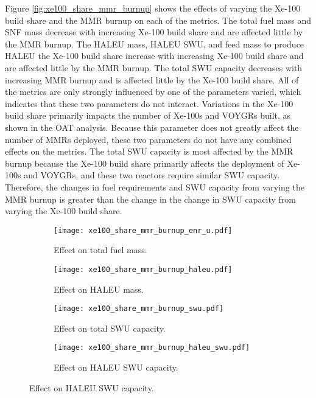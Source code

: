 Figure \ref{fig:xe100_share_mmr_burnup} shows the effects of varying the 
Xe-100 build share and the \gls{MMR} burnup on each of the metrics. 
The total fuel mass and \gls{SNF} mass decrease with increasing 
Xe-100 build share and are affected little by the \gls{MMR} burnup. The
\gls{HALEU} mass, \gls{HALEU} \gls{SWU}, and feed mass to produce 
\gls{HALEU} the Xe-100 build share  increase with increasing Xe-100 
build share and are affected little by the \gls{MMR} burnup. The total 
\gls{SWU} capacity decreases with increasing \gls{MMR} burnup and is 
affected little by the Xe-100 build share. All of the metrics are only 
strongly influenced by one of the parameters varied, which indicates that 
these two parameters do not interact. Variations in the Xe-100 build 
share primarily impacts the number of Xe-100s and VOYGRs built, as shown 
in the \gls{OAT} analysis. Because this parameter does not greatly affect 
the number of \glspl{MMR} deployed, these two parameters do not have any 
combined effects on the metrics. The total \gls{SWU} capacity is most affected 
by the \gls{MMR} burnup because the Xe-100 build share primarily 
affects the deployment of Xe-100s and VOYGRs, and these two reactors 
require similar \gls{SWU} capacity. Therefore, the changes in fuel 
requirements and \gls{SWU} capacity from varying the \gls{MMR} burnup 
is greater than the change in the change in \gls{SWU} capacity from 
varying the Xe-100 build share. 
\begin{figure}
    \begin{subfigure}[t]{0.48\textwidth}
        \centering
        \texttt{[image: xe100\_share\_mmr\_burnup\_enr\_u.pdf]}
        \caption{Effect on total fuel mass.}
        \label{fig:xe100_share_mmr_burnup_enr_u}
    \end{subfigure}
    \hfill
    \begin{subfigure}[t]{0.48\textwidth}
        \centering
        \texttt{[image: xe100\_share\_mmr\_burnup\_haleu.pdf]}
        \caption{Effect on HALEU mass.}
        \label{fig:xe100_share_mmr_burnup_haleu}
    \end{subfigure}
    
    \begin{subfigure}[t]{0.48\textwidth}
        \centering
        \texttt{[image: xe100\_share\_mmr\_burnup\_swu.pdf]}
        \caption{Effect on total SWU capacity.}
        \label{fig:xe100_share_mmr_burnup_swu}
    \end{subfigure}
    \hfill
    \begin{subfigure}[t]{0.48\textwidth}
        \centering
        \texttt{[image: xe100\_share\_mmr\_burnup\_haleu\_swu.pdf]}
        \caption{Effect on HALEU SWU capacity.}
        \label{fig:xe100_share_mmr_burnup_haleu_swu}
    \end{subfigure}    
\end{figure}

